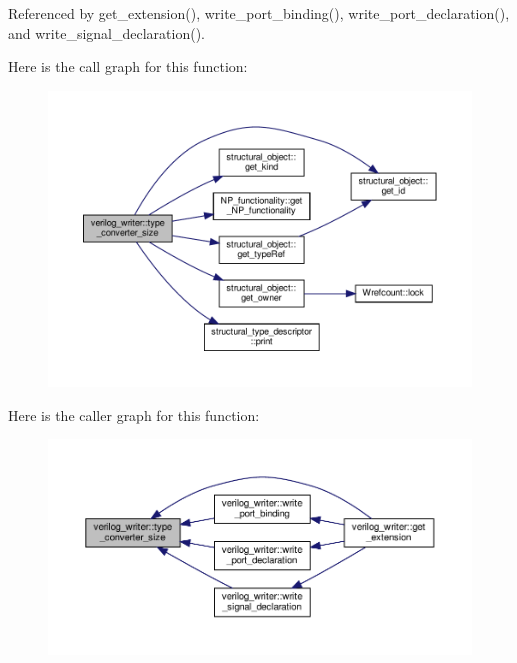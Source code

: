 Referenced by get\+\_\+extension(), write\+\_\+port\+\_\+binding(), write\+\_\+port\+\_\+declaration(), and write\+\_\+signal\+\_\+declaration().

Here is the call graph for this function\+:
\nopagebreak
\begin{figure}[H]
\begin{center}
\leavevmode
\includegraphics[width=350pt]{d8/dba/classverilog__writer_aa7a775e57ed2f7d4d613352bd239a279_cgraph}
\end{center}
\end{figure}
Here is the caller graph for this function\+:
\nopagebreak
\begin{figure}[H]
\begin{center}
\leavevmode
\includegraphics[width=350pt]{d8/dba/classverilog__writer_aa7a775e57ed2f7d4d613352bd239a279_icgraph}
\end{center}
\end{figure}
\mbox{\label{classverilog__writer_a67bc3c89705a8863735409e64aa8cf32}} 
